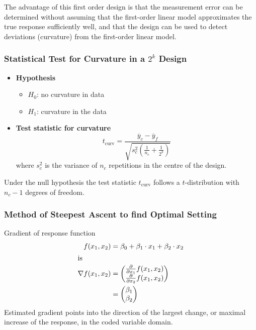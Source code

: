 \documentclass[11pt]{article}
\theoremstyle{definition}
\newcommand*\samplemean[1]{\overline{#1}}
\begin{document}
The advantage of this first order design is that the measurement error can be determined without assuming that the first-order linear model approximates the true response sufficiently well, and that the design can be used to detect deviations (curvature) from the first-order linear model.

\subsubsection{Statistical Test for Curvature in a $2^k$ Design}
\begin{itemize}[leftmargin=*,label=]
	\item \textbf{Hypothesis}
	\begin{itemize}
		\item $H_0$: no curvature in data
		\item $H_1$: curvature in the data
	\end{itemize}
	\item \textbf{Test statistic for curvature}
	\begin{equation*}
		t_{\text{curv}} = \frac{\samplemean{y}_c - \samplemean{y}_f}{\sqrt{s_c^2\left(\frac{1}{n_c} + \frac{1}{2^k}\right)}}
	\end{equation*}
	where $s_c^2$ is the variance of $n_c$ repetitions in the centre of the design.
\end{itemize}

Under the null hypothesis the test statistic $t_{\text{curv}}$ follows a $t$-distribution with $n_c-1$ degrees of freedom.

\subsubsection{Method of Steepest Ascent to find Optimal Setting}
Gradient of response function
\begin{align*}
	f(x_1, x_2) &= \beta_0 + \beta_1\cdot x_1 + \beta_2\cdot x_2\\
	\intertext{is}
	\nabla f(x_1, x_2) &= \begin{pmatrix}
		\frac{\partial}{\partial x_1}f(x_1, x_2)\\
		\frac{\partial}{\partial x_2}f(x_1, x_2)
	\end{pmatrix}\\
	&= \begin{pmatrix}
		\beta_1\\
		\beta_2
	\end{pmatrix}
\end{align*}
Estimated gradient points into the direction of the largest change, or maximal increase of the response, in the coded variable domain.
\end{document}
